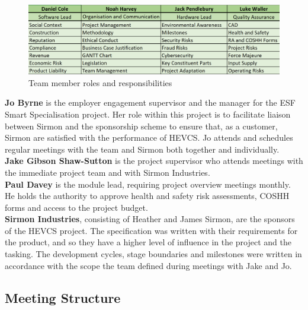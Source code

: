 \documentclass [12pt]{article}
\begin{document}
\begin{figure}[H]
\centerline{\includegraphics[width=1\textwidth]{TeamRoles.png}}
\caption{Team member roles and responsibilities}
\label{fig:figure_1}
\end{figure}

\textbf{Jo Byrne} is the employer engagement supervisor and the manager for the ESF Smart Specialisation project. Her role within this project is to facilitate liaison between Sirmon and the sponsorship scheme to ensure that, as a customer, Sirmon are satisfied with the performance of HEVCS. Jo attends and schedules regular meetings with the team and Sirmon both together and individually.
\\
\textbf{Jake Gibson Shaw-Sutton} is the project supervisor who attends meetings with the immediate project team and with Sirmon Industries.
\\
\textbf{Paul Davey} is the module lead, requiring project overview meetings monthly. He holds the authority to approve health and safety risk assessments, COSHH forms and access to the project budget.
\\
\textbf{Sirmon Industries}, consisting of Heather and James Sirmon, are the sponsors of the HEVCS project. The specification was written with their requirements for the product, and so they have a higher level of influence in the project and the tasking. The development cycles, stage boundaries and milestones were written in accordance with the scope the team defined during meetings with Jake and Jo.

\subsection{Meeting Structure}\label{sec:Meeting_Structure}
\end{document}
